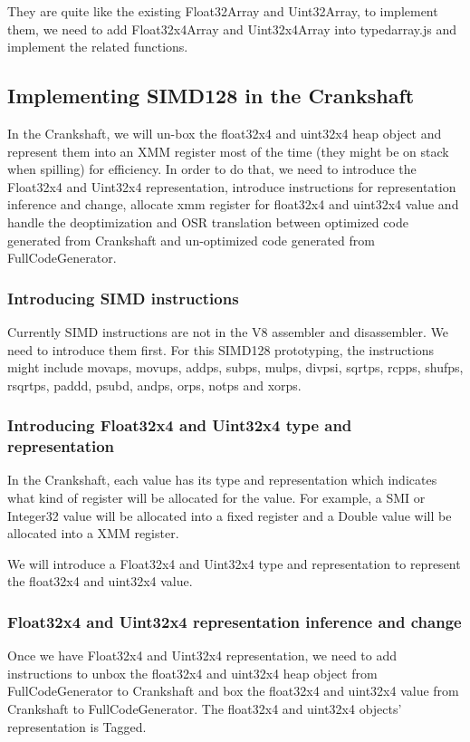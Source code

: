 \documentclass[12pt]{article} %
\begin{document}
They are quite like the existing Float32Array and Uint32Array, to implement
them, we need to add Float32x4Array and Uint32x4Array into typedarray.js and
implement the related functions.

\subsection{Implementing SIMD128 in the Crankshaft}
In the Crankshaft, we will un-box the float32x4 and uint32x4 heap object and
represent them into an XMM register most of the time (they might be on stack
when spilling) for efficiency. In order to do that, we need to introduce the
Float32x4 and Uint32x4 representation, introduce instructions for
representation inference and change, allocate xmm register for float32x4 and
uint32x4 value and handle the deoptimization and OSR translation between
optimized code generated from Crankshaft and un-optimized code generated from
FullCodeGenerator.

\subsubsection{Introducing SIMD instructions}
Currently SIMD instructions are not in the V8 assembler and disassembler. We
need to introduce them first. For this SIMD128 prototyping, the instructions
might include movaps, movups, addps, subps, mulps, divpsi, sqrtps, rcpps,
shufps, rsqrtps, paddd, psubd, andps, orps, notps and xorps.

\subsubsection{Introducing Float32x4 and Uint32x4 type and representation}
In the Crankshaft, each value has its type and representation which indicates
what kind of register will be allocated for the value. For example, a SMI or
Integer32 value will be allocated into a fixed register and a Double value will
be allocated into a XMM register.

We will introduce a Float32x4 and Uint32x4 type and representation to represent
the float32x4 and uint32x4 value.

\subsubsection{Float32x4 and Uint32x4 representation inference and change}
Once we have Float32x4 and Uint32x4 representation, we need to add instructions
to unbox the float32x4 and uint32x4 heap object from FullCodeGenerator to
Crankshaft and box the float32x4 and uint32x4 value from Crankshaft to
FullCodeGenerator. The float32x4 and uint32x4 objects' representation is
Tagged.
\end{document}
